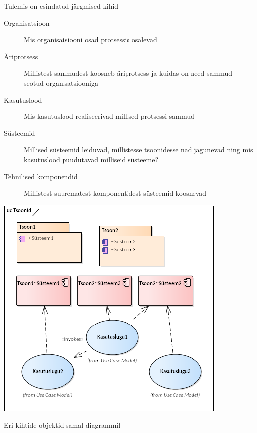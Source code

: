 \documentclass[nobib]{tufte-handout}
\begin{document}
Tulemis on esindatud järgmised kihid
\begin{description}
	\item[Organisatsioon] Mis organisatsiooni osad protsessis osalevad
	\item[Äriprotsess] Millistest sammudest koosneb äriprotsess ja kuidas on need sammud seotud organisatsiooniga
	\item[Kasutuslood] Mis kasutuslood realiseerivad millised protsessi sammud
	\item[Süsteemid] Millised süsteemid leiduvad, millistesse tsoonidesse nad jagunevad ning mis kasutuslood puudutavad milliseid süsteeme?
	\item[Tehnilised komponendid] Millistest suurematest komponentidest süsteemid koosnevad
\end{description}
\begin{marginfigure}%
  \includegraphics[width=\linewidth]{tsoonid.png}
  \caption{Eri kihtide objektid samal diagrammil}
  \label{fig:zone}
\end{marginfigure}
\end{document}

